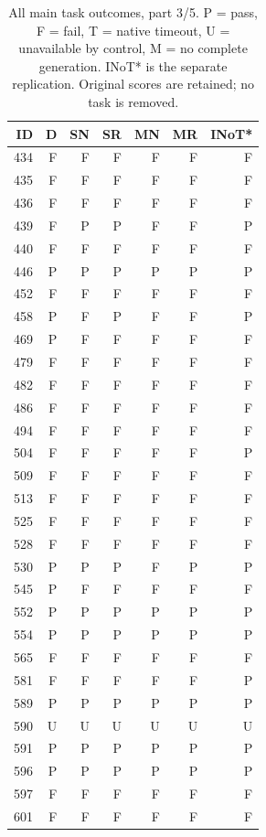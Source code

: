 \begin{table}[!htbp]\centering\footnotesize
\caption{All main task outcomes, part 3/5. P = pass, F = fail, T = native timeout, U = unavailable by control, M = no complete generation. INoT* is the separate replication. Original scores are retained; no task is removed.}
\begin{tabular*}{\textwidth}{@{\extracolsep{\fill}}rrrrrrr}\toprule
ID & D & SN & SR & MN & MR & INoT*\\\midrule
434 & F & F & F & F & F & F\\
435 & F & F & F & F & F & F\\
436 & F & F & F & F & F & F\\
439 & F & P & P & F & F & P\\
440 & F & F & F & F & F & F\\
446 & P & P & P & P & P & P\\
452 & F & F & F & F & F & F\\
458 & P & F & P & F & F & P\\
469 & P & F & F & F & F & F\\
479 & F & F & F & F & F & F\\
482 & F & F & F & F & F & F\\
486 & F & F & F & F & F & F\\
494 & F & F & F & F & F & F\\
504 & F & F & F & F & F & P\\
509 & F & F & F & F & F & F\\
513 & F & F & F & F & F & F\\
525 & F & F & F & F & F & F\\
528 & F & F & F & F & F & F\\
530 & P & P & P & F & P & P\\
545 & P & F & F & F & F & F\\
552 & P & P & P & P & P & P\\
554 & P & P & P & P & P & P\\
565 & F & F & F & F & F & F\\
581 & F & F & F & F & F & P\\
589 & P & P & P & P & P & P\\
590 & U & U & U & U & U & U\\
591 & P & P & P & P & P & P\\
596 & P & P & P & P & P & P\\
597 & F & F & F & F & F & F\\
601 & F & F & F & F & F & F\\

\end{tabular*}
\end{table}
